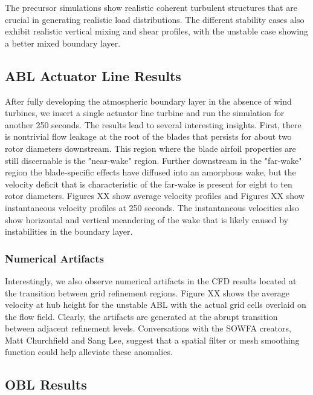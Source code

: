 The precursor simulations show realistic coherent turbulent structures that are crucial in generating realistic load distributions.  The different stability cases also exhibit realistic vertical mixing and shear profiles, with the unstable case showing a better mixed boundary layer.

\subsection{ABL Actuator Line Results}
After fully developing the atmospheric boundary layer in the absence of wind turbines, we insert a single actuator line turbine and run the simulation for another 250 seconds.  The results lead to several interesting insights.  First, there is nontrivial flow leakage at the root of the blades that persists for about two rotor diameters downstream.  This region where the blade airfoil properties are still discernable is the "near-wake" region\cite{sanderse_review_2011}.  Further downstream in the "far-wake" region the blade-specific effects have diffused into an amorphous wake, but the velocity deficit that is characteristic of the far-wake is present for eight to ten rotor diameters.  Figures XX show average velocity profiles and Figures XX show instantaneous velocity profiles at 250 seconds.  The instantaneous velocities also show horizontal and vertical meandering of the wake that is likely caused by instabilities in the boundary layer.

\subsubsection{Numerical Artifacts}
Interestingly, we also observe numerical artifacts in the CFD results located at the transition between grid refinement regions.  Figure XX shows the average velocity at hub height for the unstable ABL with the actual grid cells overlaid on the flow field.  Clearly, the artifacts are generated at the abrupt transition between adjacent refinement levels.  Conversations with the SOWFA creators, Matt Churchfield and Sang Lee, suggest that a spatial filter or mesh smoothing function could help alleviate these anomalies.



\subsection{OBL Results}

